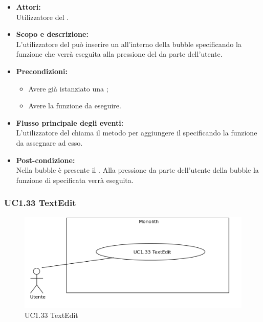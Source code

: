 \begin{itemize}
	\item \textbf{Attori:}
	\\Utilizzatore del .
	\item \textbf{Scopo e descrizione:} 
	\\L’utilizzatore del  può inserire un   all’interno della bubble specificando la funzione che verrà eseguita alla pressione del  da parte dell’utente.
	\item \textbf{Precondizioni:}
	\begin{itemize}
		\item Avere già istanziato una ;
		\item Avere la funzione da eseguire.
	\end{itemize}
	\item \textbf{Flusso principale degli eventi:}
	\\L’utilizzatore del  chiama il metodo per aggiungere il  specificando la funzione da assegnare ad esso.
	\item \textbf{Post-condizione:}
	\\Nella bubble è presente il . Alla pressione da parte dell'utente della bubble la funzione di  specificata verrà eseguita.
\end{itemize}

\subsubsection{UC1.33 TextEdit} \label{UC1.33}

\begin{figure}[H]
	\centering
	\includegraphics[width=15cm]{../../documenti/AnalisiDeiRequisiti/Diagrammi_img/uc1_33.png}
	\caption{UC1.33 TextEdit}
\end{figure}

